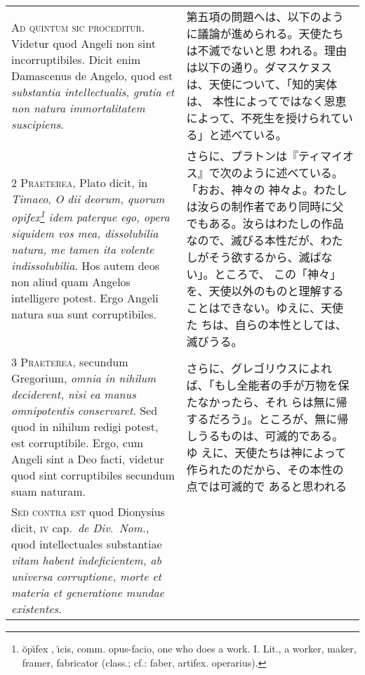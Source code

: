 \documentclass[10pt]{jsarticle} %
\begin{document}
\begin{longtable}{p{21em}p{21em}}

{\huge A}{\scshape d quintum sic proceditur}. Videtur quod
Angeli non sint incorruptibiles. Dicit enim Damascenus de Angelo, quod
est {\itshape substantia intellectualis, gratia et non natura immortalitatem
suscipiens}.


&

第五項の問題へは、以下のように議論が進められる。天使たちは不滅でないと思
 われる。理由は以下の通り。ダマスケヌスは、天使について、「知的実体は、
 本性によってではなく恩恵によって、不死生を授けられている」と述べている。

\\


{\scshape 2 Praeterea}, Plato dicit, in {\itshape Timaeo}, {\itshape O
dii deorum, quorum opifex\footnote{ \u{o}p\u{\i}fex , \u{\i}cis,
comm. opus-facio, one who does a work.  I. Lit., a worker, maker,
framer, fabricator (class.; cf.: faber, artifex. operarius).  } idem
paterque ego, opera siquidem vos mea, dissolubilia natura, me tamen ita
volente indissolubilia}. Hos autem deos non aliud quam Angelos
intelligere potest. Ergo Angeli natura sua sunt corruptibiles.

&

さらに、プラトンは『ティマイオス』で次のように述べている。「おお、神々の
 神々よ。わたしは汝らの制作者であり同時に父でもある。汝らはわたしの作品
 なので、滅びる本性だが、わたしがそう欲するから、滅ばない」。ところで、
 この「神々」を、天使以外のものと理解することはできない。ゆえに、天使た
 ちは、自らの本性としては、滅びうる。

\\


{\scshape 3 Praeterea}, secundum Gregorium, {\itshape omnia in
nihilum deciderent, nisi ea manus omnipotentis conservaret}. Sed quod in
nihilum redigi potest, est corruptibile. Ergo, cum Angeli sint a Deo
facti, videtur quod sint corruptibiles secundum suam naturam.


&
さらに、グレゴリウスによれば、「もし全能者の手が万物を保たなかったら、それ
 らは無に帰するだろう」。ところが、無に帰しうるものは、可滅的である。ゆ
 えに、天使たちは神によって作られたのだから、その本性の点では可滅的で
 あると思われる

\\


{\scshape Sed contra est} quod Dionysius dicit, {\scshape iv}
cap.~{\itshape de Div.~Nom.}, quod intellectuales substantiae {\itshape
vitam habent indeficientem, ab universa corruptione, morte et materia et
generatione mundae existentes}.



\end{longtable}
\end{document}
